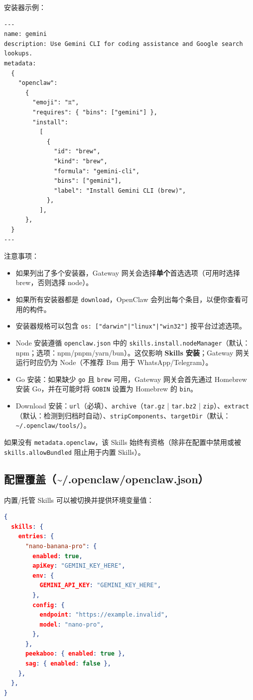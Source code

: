 安装器示例：

\begin{lstlisting}
---
name: gemini
description: Use Gemini CLI for coding assistance and Google search lookups.
metadata:
  {
    "openclaw":
      {
        "emoji": "♊️",
        "requires": { "bins": ["gemini"] },
        "install":
          [
            {
              "id": "brew",
              "kind": "brew",
              "formula": "gemini-cli",
              "bins": ["gemini"],
              "label": "Install Gemini CLI (brew)",
            },
          ],
      },
  }
---
\end{lstlisting}


注意事项：

\begin{itemize}
  \item 如果列出了多个安装器，Gateway 网关会选择\textbf{单个}首选选项（可用时选择 brew，否则选择 node）。
  \item 如果所有安装器都是 \texttt{download}，OpenClaw 会列出每个条目，以便你查看可用的构件。
  \item 安装器规格可以包含 \texttt{os: ["darwin"|"linux"|"win32"]} 按平台过滤选项。
  \item Node 安装遵循 \texttt{openclaw.json} 中的 \texttt{skills.install.nodeManager}（默认：npm；选项：npm/pnpm/yarn/bun）。这仅影响 \textbf{Skills 安装}；Gateway 网关运行时应仍为 Node（不推荐 Bun 用于 WhatsApp/Telegram）。
  \item Go 安装：如果缺少 \texttt{go} 且 \texttt{brew} 可用，Gateway 网关会首先通过 Homebrew 安装 Go，并在可能时将 \texttt{GOBIN} 设置为 Homebrew 的 \texttt{bin}。
  \item Download 安装：\texttt{url}（必填）、\texttt{archive}（\texttt{tar.gz} | \texttt{tar.bz2} | \texttt{zip}）、\texttt{extract}（默认：检测到归档时自动）、\texttt{stripComponents}、\texttt{targetDir}（默认：\texttt{\textasciitilde{}/.openclaw/tools/}）。
\end{itemize}


如果没有 \texttt{metadata.openclaw}，该 Skills 始终有资格（除非在配置中禁用或被 \texttt{skills.allowBundled} 阻止用于内置 Skills）。

\subsection{配置覆盖（\textasciitilde{}/.openclaw/openclaw.json）}


内置/托管 Skills 可以被切换并提供环境变量值：

\begin{lstlisting}[language=json]
{
  skills: {
    entries: {
      "nano-banana-pro": {
        enabled: true,
        apiKey: "GEMINI_KEY_HERE",
        env: {
          GEMINI_API_KEY: "GEMINI_KEY_HERE",
        },
        config: {
          endpoint: "https://example.invalid",
          model: "nano-pro",
        },
      },
      peekaboo: { enabled: true },
      sag: { enabled: false },
    },
  },
}
\end{lstlisting}


